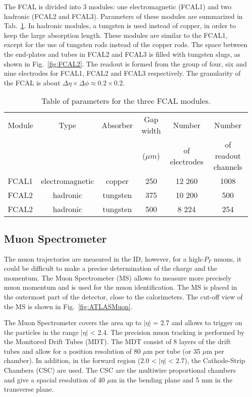 The FCAL is divided into 3 modules: one electromagnetic (FCAL1) and two hadronic (FCAL2 and FCAL3). Parameters of these modules are summarized in Tab.~\ref{tab:FCALParam}. In hadronic modules, a tungsten is used instead of copper, in order to keep the large absorption length. These modules are similar to the FCAL1, except for the use of tungsten rods instead of the copper rods. The space between the end-plates and tubes in FCAL2 and FCAL3 is filled with tungsten slugs, as shown in Fig.~\ref{fig:FCAL2}. The readout is formed from the group of four, six and nine electrodes for FCAL1, FCAL2 and FCAL3 respectively. The granularity of the FCAL is about $\Delta \eta \times \Delta \phi \approx 0.2 \times 0.2$.

\begin{table}[!tb]
\caption{Table of parameters for the three FCAL modules.}
\label{tab:FCALParam}
\begin{center}
\begin{tabular}{ l | c | c | c | c | c }
\hline
Module & Type & Absorber & Gap width & Number & Number \\
 & & &  ($\mu m$)  & of electrodes & of readout channels \\
\hline
\hline
FCAL1 &  electromagnetic & copper & 250 & 12 260 & 1008\\
FCAL2 &  hadronic & tungsten & 375 & 10 200 & 500\\
FCAL2 &  hadronic & tungsten & 500 & 8 224 & 254\\
\hline
\end{tabular}
\end{center}
\end{table}

\subsection{Muon Spectrometer}\label{sec:MuonSys}
The muon trajectories are  measured in the ID, however, for a high-$P_{T}$ muons, it could be difficult to make a precise determination of the charge and the momentum. The Muon Spectrometer (MS) allows to measure more precisely muon momentum and is used for the muon identification. The MS is placed in the outermost part of the \atlas detector, close to the calorimeters. The cut-off view of the MS is shown in Fig.~\ref{fig:ATLASMuon}.

The Muon Spectrometer covers the area up to $|\eta|$ = 2.7 and allows to trigger on the particles in the range $|\eta|$ < 2.4. The precision muon tracking is performed by the Monitored Drift Tubes (MDT). The MDT consist of 8 layers of the drift tubes and allow for a position resolution of 80 $\mu$m per tube (or 35 $\mu$m per chamber). In addition, in the forward region (2.0 < $|\eta|$ < 2.7), the Cathode-Strip Chambers (CSC) are used. The CSC are the multiwire proportional chambers and give a spacial resolution of 40 $\mu$m in the bending plane and 5 mm in the transverse plane.

